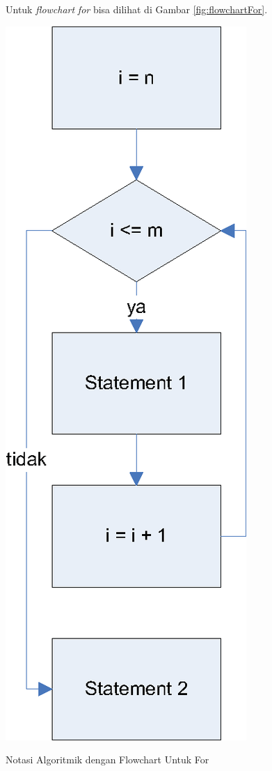 \newpage

Untuk \textit{flowchart} \textit{for} bisa dilihat di Gambar \ref{fig:flowchartFor}.
\begin{marginfigure}[3cm]%
\centering
\includegraphics[scale=0.5]{fig/flowchart-FOR.eps}%
\caption{\Centering Notasi Algoritmik dengan Flowchart Untuk For}%
\label{fig:flowchartFor}%
\end{marginfigure}


